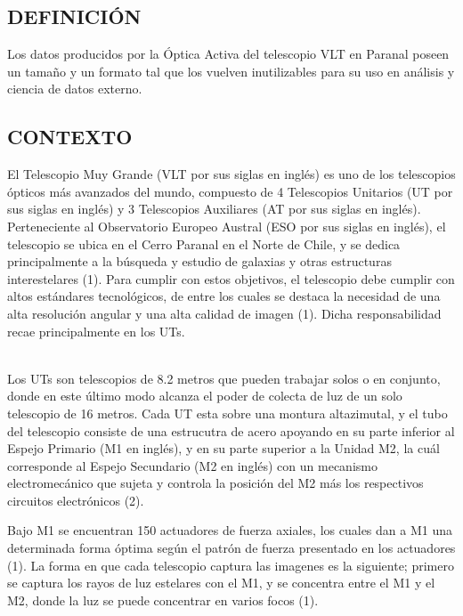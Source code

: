 
\subsection{DEFINICIÓN}

Los datos producidos por la Óptica Activa del telescopio VLT en Paranal poseen un tamaño y un formato tal que los vuelven
inutilizables para su uso en análisis y ciencia de datos externo.

\subsection{CONTEXTO}

El Telescopio Muy Grande (VLT por sus siglas en inglés) es uno de los telescopios ópticos más avanzados del mundo, compuesto de 4 Telescopios Unitarios (UT por sus siglas en inglés) y 3 Telescopios Auxiliares (AT por sus siglas en inglés).
Perteneciente al Observatorio Europeo Austral (ESO por sus siglas en inglés), el telescopio se ubica en el Cerro Paranal en el Norte de Chile, y se dedica principalmente a la búsqueda y estudio de galaxias y otras estructuras interestelares (1).
Para cumplir con estos objetivos, el telescopio debe cumplir con altos estándares tecnológicos, de entre los cuales se destaca la necesidad de una alta resolución angular y una alta calidad de imagen (1). Dicha responsabilidad recae principalmente en los UTs.

\\

Los UTs son telescopios de 8.2 metros que pueden trabajar solos o en conjunto, donde en este último modo alcanza el poder de colecta de luz de un solo telescopio de 16 metros.
Cada UT esta sobre una montura altazimutal, y el tubo del telescopio consiste de una estrucutra de acero apoyando en su parte inferior al Espejo Primario (M1 en inglés), y en su parte superior a la Unidad M2, la cuál corresponde al Espejo Secundario (M2 en inglés) con un mecanismo electromecánico que sujeta y controla la posición
del M2 más los respectivos circuitos electrónicos (2).

Bajo M1 se encuentran 150 actuadores de fuerza axiales, los cuales dan a M1 una determinada forma óptima según el patrón de fuerza presentado en los actuadores (1).
La forma en que cada telescopio captura las imagenes es la siguiente; primero se captura los rayos de luz estelares con el M1, y se concentra entre el M1 y el M2, donde la luz se puede concentrar en varios focos (1).
 
